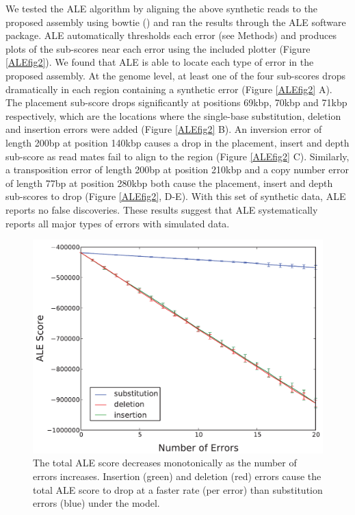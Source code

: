 \documentclass[phd,tocprelim]{cornell}
\begin{document}
We tested the ALE algorithm by aligning the above synthetic reads to the proposed assembly using bowtie (\cite{Langmead2009}) and ran the results through the ALE software package. ALE automatically thresholds each error (see Methods) and produces plots of the sub-scores near each error using the included plotter (Figure \ref{ALEfig2}). We found that ALE is able to locate each type of error in the proposed assembly. At the genome level, at least one of the four sub-scores drops dramatically in each region containing a synthetic error (Figure \ref{ALEfig2} A). The placement sub-score drops significantly at positions 69kbp, 70kbp and 71kbp respectively, which are the locations where the single-base substitution, deletion and insertion errors were added (Figure \ref{ALEfig2} B). An inversion error of length 200bp at position 140kbp causes a drop in the placement, insert and depth sub-score as read mates fail to align to the region (Figure \ref{ALEfig2} C). Similarly, a transposition error of length 200bp at position 210kbp and a copy number error of length 77bp at position 280kbp both cause the placement, insert and depth sub-scores to drop (Figure \ref{ALEfig2}, D-E). With this set of synthetic data, ALE reports no false discoveries. These results suggest that ALE systematically reports all major types of errors with simulated data.

\begin{figure}[!tpb]%
    \centerline{\includegraphics[width=\textwidth]{figures/ALE/Clark_Fig3b.pdf}}
    \caption[ALE score vs. number of errors]{The total ALE score decreases monotonically as the number of errors increases. Insertion (green) and deletion (red) errors cause the total ALE score to drop at a faster rate (per error) than substitution errors (blue) under the model.}\label{ALEfig3}
\end{figure}
\end{document}
